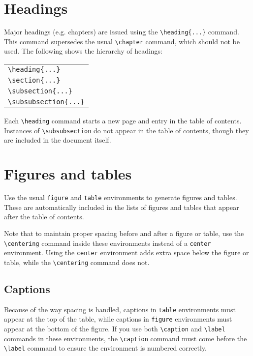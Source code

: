 \documentclass{article}
\begin{document}
\section{Headings}
Major headings (e.g. chapters) are issued using the \texttt{\textbackslash heading\{...\}} command. This command supersedes the usual \texttt{\textbackslash chapter} command, which should not be used. The following shows the hierarchy of headings:
\begin{center}
\begin{tabular}{l}
\texttt{\textbackslash heading\{...\}} \\
\texttt{\textbackslash section\{...\}} \\
\texttt{\textbackslash subsection\{...\}} \\
\texttt{\textbackslash subsubsection\{...\}}
\end{tabular}
\end{center}
Each \texttt{\textbackslash heading} command starts a new page and entry in the table of contents. Instances of \texttt{\textbackslash subsubsection} do not appear in the table of contents, though they are included in the document itself.

\section{Figures and tables}
Use the usual \texttt{figure} and \texttt{table} environments to generate figures and tables. These are automatically included in the lists of figures and tables that appear after the table of contents.

Note that to maintain proper spacing before and after a figure or table, use the \texttt{\textbackslash centering} command inside these environments instead of a \texttt{center} environment. Using the \texttt{center} environment adds extra space below the figure or table, while the \texttt{\textbackslash centering} command does not.

\subsection{Captions}
Because of the way spacing is handled, captions in \texttt{table} environments must appear at the top of the table, while captions in \texttt{figure} environments must appear at the bottom of the figure. If you use both \texttt{\textbackslash caption} and \texttt{\textbackslash label} commands in these environments, the \texttt{\textbackslash caption} command must come before the \texttt{\textbackslash label} command to ensure the environment is numbered correctly.
\end{document}
